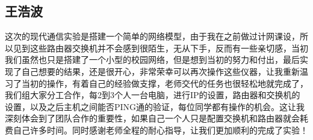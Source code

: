 \subsection{王浩波}
这次的现代通信实验是搭建一个简单的网络模型，由于我在之前做过计网课设，所以见到这些路由器交换机并不会感到很陌生，无从下手，反而有一些亲切感，当初我们虽然也只是搭建了一个小型的校园网络，但是想到当初的努力和付出，最后实现了自己想要的结果，还是很开心，非常荣幸可以再次操作这些仪器，让我重新温习了当初的操作，有着自己的经验做支撑，老师交代的任务也很轻松地就完成了，我们组大家分工合作，每2到3个人一台电脑，进行IP的设置，路由器和交换机的设置，以及之后主机之间能否PING通的验证，每位同学都有操作的机会。这让我深刻体会到了团队合作的重要性，如果自己一个人只是配置交换机和路由器就会耗费自己许多时间。同时感谢老师全程的耐心指导，让我们更加顺利的完成了实验！

